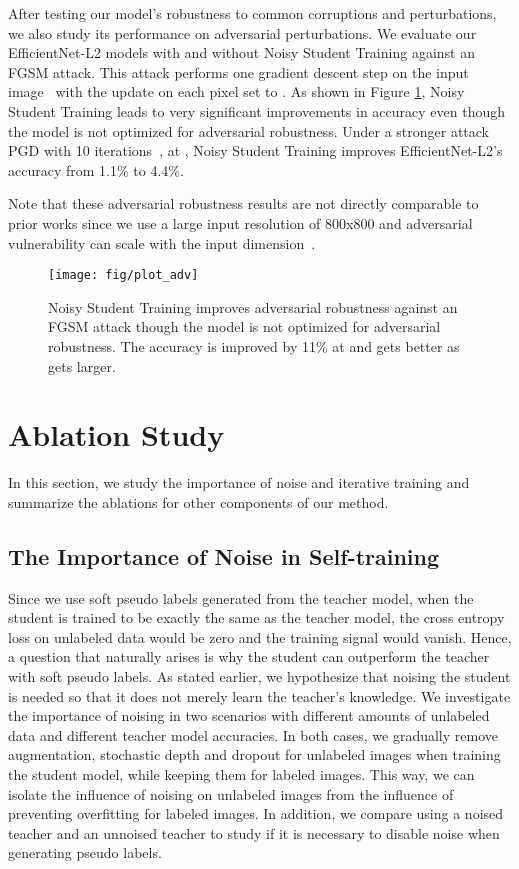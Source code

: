 \documentclass[10pt,twocolumn,letterpaper]{article}
\begin{document}
After testing our model's robustness to common corruptions and perturbations, we also study its performance on adversarial perturbations. We evaluate our EfficientNet-L2 models with and without Noisy Student Training against an FGSM attack. This attack performs one gradient descent step on the input image~\cite{goodfellow2014explaining} with the update on each pixel set to . 
As shown in Figure \ref{fig:adv_robustness}, Noisy Student Training leads to very significant improvements in accuracy even though the model is not optimized for adversarial robustness. Under a stronger attack PGD with 10 iterations~\cite{madry2017towards}, at ,
Noisy Student Training improves EfficientNet-L2's accuracy from 1.1\% to 4.4\%.

Note that these adversarial robustness results are not directly comparable to prior works since we use a large input resolution of 800x800 and adversarial vulnerability can scale with the input dimension~\cite{galloway2019batch,goodfellow2014explaining,gilmer2018adversarial,simon2019first}.

\begin{figure}[h!]
\centering
  \texttt{[image: fig/plot\_adv]}
    \caption{Noisy Student Training improves adversarial robustness against an FGSM attack though the model is not optimized for adversarial robustness. The accuracy is improved by 11\% at  and gets better as  gets larger.  }
    \label{fig:adv_robustness}
\end{figure}

\section{Ablation Study} 
In this section, we study the importance of noise and iterative training and summarize the ablations for other components of our method. 
\subsection{The Importance of Noise in Self-training}
\label{sec:ablation_noise}
Since we use soft pseudo labels generated from the teacher model, when the student is trained to be exactly the same as the teacher model, the cross entropy loss on unlabeled data would be zero and the training signal would vanish. Hence, a question that naturally arises is why the student can outperform the teacher with soft pseudo labels. As stated earlier, we hypothesize that noising the student is needed so that it does not merely learn the teacher's knowledge. 
We investigate the importance of noising in two scenarios with  different amounts of unlabeled data and different teacher model accuracies. In both cases, we gradually remove augmentation, stochastic depth and dropout for unlabeled images when training the student model, while keeping them for labeled images. 
This way, we can isolate the influence of noising on unlabeled images from the influence of preventing overfitting for labeled images. In addition, we compare using a noised teacher and an unnoised teacher to study if it is necessary to disable noise when generating pseudo labels.
\end{document}
